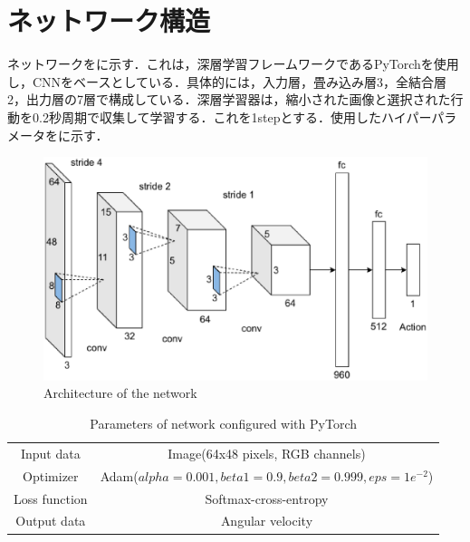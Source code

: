 
\section{ネットワーク構造}

  ネットワークをに示す．これは，深層学習フレームワークであるPyTorch\cite{pytorch}を使用し，CNNをベースとしている．具体的には，入力層，畳み込み層3，全結合層2，出力層の7層で構成している．深層学習器は，縮小された画像と選択された行動を0.2秒周期で収集して学習する．これを1stepとする．使用したハイパーパラメータをに示す．

  \begin{figure}[h]
    \centering
    \includegraphics[keepaspectratio, scale=0.60] {images/eps/RobotGuidance_network}
    \caption{Architecture of the network}
    \label{Fig:RobotGuidance_network}
  \end{figure}

  \begin{table}[hbtp]
    \caption{Parameters of network configured with PyTorch}
    \label{tab:Parameters of network configured with pytorch}
    \centering
    \begin{tabular}{cc}
      \hline
      Input data & Image(64x48 pixels, RGB channels) \\
      Optimizer & Adam($alpha = 0.001, beta1 = 0.9, beta2 =  0.999, eps = 1e^{-2}$)\\
      Loss function & Softmax-cross-entropy\\
      Output data & Angular velocity\\
      \hline
    \end{tabular}
  \end{table}

\newpage
